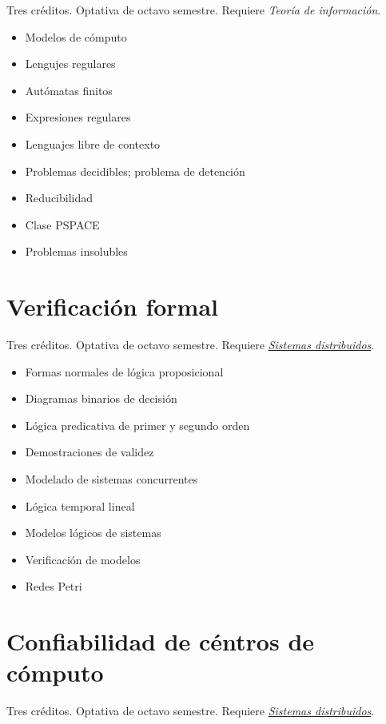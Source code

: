 \documentclass{article}
\begin{document}
\begin{multicols}{4}
Tres cr\'{e}ditos. Optativa de octavo semestre. Requiere
{\em Teor\'{i}a de informaci\'{o}n}.

\begin{itemize}
\item{Modelos de c\'{o}mputo}
\item{Lengujes regulares}
\item{Aut\'{o}matas finitos}
\item{Expresiones regulares}
\item{Lenguajes libre de contexto}
\item{Problemas decidibles; problema de detenci\'{o}n}
\item{Reducibilidad}
\item{Clase PSPACE}
\item{Problemas insolubles}
\end{itemize}

\vfill\null \columnbreak

\hypertarget{vf}{\section*{Verificaci\'{o}n formal}} 

Tres cr\'{e}ditos. Optativa de octavo semestre. Requiere
\hyperlink{sdi}{\em Sistemas distribuidos}.

\begin{itemize}
\item{Formas normales de l\'{o}gica proposicional}
\item{Diagramas binarios de decisi\'{o}n}
\item{L\'{o}gica predicativa de primer y segundo orden}
\item{Demostraciones de validez}
\item{Modelado de sistemas concurrentes}
\item{L\'{o}gica temporal lineal}
\item{Modelos l\'{o}gicos de sistemas}
\item{Verificaci\'{o}n de modelos}
\item{Redes Petri}
\end{itemize}


\newpage

\hypertarget{cdc}{\section*{Confiabilidad de c\'{e}ntros de c\'{o}mputo}} 

Tres cr\'{e}ditos. Optativa de octavo semestre. Requiere
\hyperlink{sdi}{\em Sistemas distribuidos}.


\end{multicols}
\end{document}
